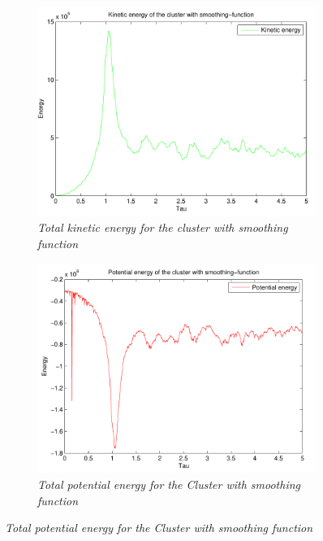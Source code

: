 \documentclass[a4paper,12pt, english]{article}
\begin{document}
\begin{figure}[H]
	\centering
        \begin{subfigure}[b]{0.6\textwidth}
        \includegraphics[scale=0.5]{kine_n1000t5.pdf}
        \caption{\textit{Total kinetic energy for the cluster with smoothing function}}
        
		\end{subfigure}
		
		\begin{subfigure}[b]{0.6\textwidth}
        \includegraphics[scale=0.5]{pote_n1000t5.pdf}
        \caption{\textit{Total potential energy for the Cluster with smoothing function}}
		\end{subfigure}
		\label{fig:kin_pot}        
\end{figure}
\end{document}

